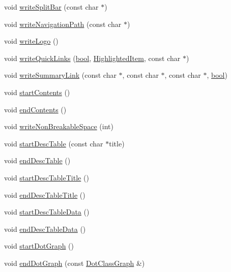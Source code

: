 \begin{DoxyCompactItemize}
void \hyperlink{class_r_t_f_generator_a94c98bdf4ad6589a902e283cb3a31995}{write\+Split\+Bar} (const char $\ast$)
\item 
void \hyperlink{class_r_t_f_generator_ae9e70a811ebae6face08d0c2c019af16}{write\+Navigation\+Path} (const char $\ast$)
\item 
void \hyperlink{class_r_t_f_generator_a94f7432f76fdcce01b1706170cd6c433}{write\+Logo} ()
\item 
void \hyperlink{class_r_t_f_generator_a7bfd450f1bfcdb82217da1e88646f030}{write\+Quick\+Links} (\hyperlink{qglobal_8h_a1062901a7428fdd9c7f180f5e01ea056}{bool}, \hyperlink{index_8h_a6643b7765422a7eb577f0b2ed8fb2e09}{Highlighted\+Item}, const char $\ast$)
\item 
void \hyperlink{class_r_t_f_generator_acdcae4f58554de53360da212e0d9065a}{write\+Summary\+Link} (const char $\ast$, const char $\ast$, const char $\ast$, \hyperlink{qglobal_8h_a1062901a7428fdd9c7f180f5e01ea056}{bool})
\item 
void \hyperlink{class_r_t_f_generator_a59a9e3d72221d5ca1cd6d37ac243b3bc}{start\+Contents} ()
\item 
void \hyperlink{class_r_t_f_generator_a51da5e989909409618e46e6d161948ed}{end\+Contents} ()
\item 
void \hyperlink{class_r_t_f_generator_a0f51f9022b3e8f3d95f154e0d4d5b201}{write\+Non\+Breakable\+Space} (int)
\item 
void \hyperlink{class_r_t_f_generator_ac5e98d54b526e7f2356dfb673bef4119}{start\+Desc\+Table} (const char $\ast$title)
\item 
void \hyperlink{class_r_t_f_generator_ae98972ee6670de733f0ec0fa00cb1a67}{end\+Desc\+Table} ()
\item 
void \hyperlink{class_r_t_f_generator_afa65fd09520391f8db47a98d2ac210c3}{start\+Desc\+Table\+Title} ()
\item 
void \hyperlink{class_r_t_f_generator_a9c091d5c54d49a0eebac04726a8c0f39}{end\+Desc\+Table\+Title} ()
\item 
void \hyperlink{class_r_t_f_generator_ac79979b6bd1ccc052698058158d2f1e6}{start\+Desc\+Table\+Data} ()
\item 
void \hyperlink{class_r_t_f_generator_ab98bd7772c1a72bf4d2cac4c00aa90a2}{end\+Desc\+Table\+Data} ()
\item 
void \hyperlink{class_r_t_f_generator_ac284549ad668918d625e7fa824920f3c}{start\+Dot\+Graph} ()
\item 
void \hyperlink{class_r_t_f_generator_a7fe78cf6bb451f3d63cd46e45633db92}{end\+Dot\+Graph} (const \hyperlink{class_dot_class_graph}{Dot\+Class\+Graph} \&)

\end{DoxyCompactItemize}
